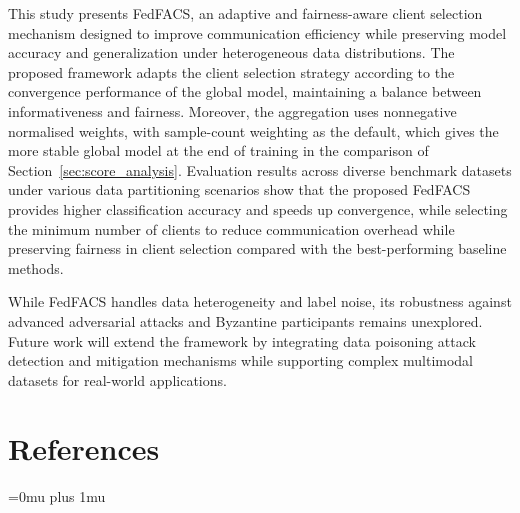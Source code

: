 \documentclass[pdflatex,sn-mathphys-num,oneside]{sn-jnl}%
\theoremstyle{thmstyleone}%
\theoremstyle{thmstyletwo}%
\theoremstyle{thmstylethree}%
\begin{document}
This study presents FedFACS, an adaptive and fairness-aware client selection mechanism designed to improve communication efficiency while preserving model accuracy and generalization under heterogeneous data distributions. The proposed framework adapts the client selection strategy according to the convergence performance of the global model, maintaining a balance between informativeness and fairness. Moreover, the aggregation uses nonnegative normalised weights, with sample-count weighting as the default, which gives the more stable global model at the end of training in the comparison of Section~\ref{sec:score_analysis}. Evaluation results across diverse benchmark datasets under various data partitioning scenarios show that the proposed FedFACS provides higher classification accuracy and speeds up convergence, while selecting the minimum number of clients to reduce communication overhead while preserving fairness in client selection compared with the best-performing baseline methods.

While FedFACS handles data heterogeneity and label noise, its robustness against advanced adversarial attacks and Byzantine participants remains unexplored. Future work will extend the framework by integrating data poisoning attack detection and mitigation mechanisms while supporting complex multimodal datasets for real-world applications.

\FloatBarrier
\backmatter


\section{References}

\begingroup
\small
\setlength{\emergencystretch}{2em}
\setlength{\parindent}{0pt}
\setlength{\parskip}{0pt}
\setlength{\leftskip}{0pt}
\setlength{\rightskip}{0pt}
\Urlmuskip=0mu plus 1mu\relax
\renewcommand{\section}[2]{}
\end{document}
